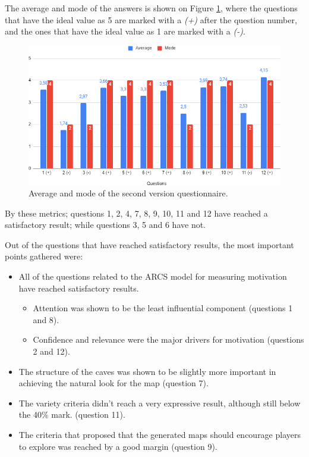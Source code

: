 The average and mode of the answers is shown on Figure \ref{fig:final_res}, where the questions that have the ideal value as 5 are marked with a \emph{(+)} after the question number, and the ones that have the ideal value as 1 are marked with a \emph{(-)}.

\begin{figure}[h]
    \caption{Average and mode of the second version questionnaire.}
    \centerline{\includegraphics{images/survey/final_results.png}}
    \label{fig:final_res}
\end{figure}

By these metrics; questions 1, 2, 4, 7, 8, 9, 10, 11 and 12 have reached a satisfactory result; while questions 3, 5 and 6 have not.

Out of the questions that have reached satisfactory results, the most important points gathered were:
\begin{itemize}
    \item All of the questions related to the ARCS model for measuring motivation have reached satisfactory results.
    \begin{itemize}
        \item Attention was shown to be the least influential component (questions 1 and 8).
        \item Confidence and relevance were the major drivers for motivation (questions 2 and 12).
    \end{itemize}
    \item The structure of the caves was shown to be slightly more important in achieving the natural look for the map (question 7).
    \item The variety criteria didn't reach a very expressive result, although still below the 40\% mark. (question 11).
    \item The criteria that proposed that the generated maps should encourage players to explore was reached by a good margin (question 9).
\end{itemize}

